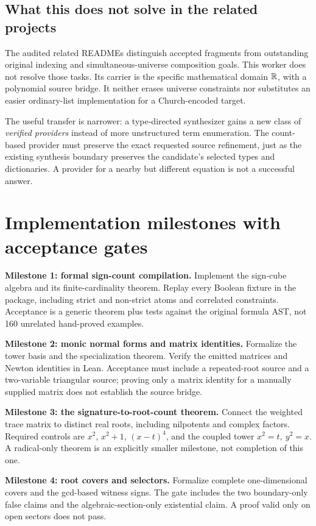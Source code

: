 \subsection{What this does not solve in the related projects}

The audited related READMEs distinguish accepted fragments from outstanding original indexing and simultaneous-universe composition goals. This worker does not resolve those tasks. Its carrier is the specific mathematical domain $\mathbb R$, with a polynomial source bridge. It neither erases universe constraints nor substitutes an easier ordinary-list implementation for a Church-encoded target.

The useful transfer is narrower: a type-directed synthesizer gains a new class of \emph{verified providers} instead of more unstructured term enumeration. The count-based provider must preserve the exact requested source refinement, just as the existing synthesis boundary preserves the candidate's selected types and dictionaries. A provider for a nearby but different equation is not a successful answer.

\section{Implementation milestones with acceptance gates}\label{sec:roadmap}

\textbf{Milestone 1: formal sign-count compilation.} Implement the sign-cube algebra and its finite-cardinality theorem. Replay every Boolean fixture in the package, including strict and non-strict atoms and correlated constraints. Acceptance is a generic theorem plus tests against the original formula AST, not 160 unrelated hand-proved examples.

\textbf{Milestone 2: monic normal forms and matrix identities.} Formalize the tower basis and the specialization theorem. Verify the emitted matrices and Newton identities in Lean. Acceptance must include a repeated-root source and a two-variable triangular source; proving only a matrix identity for a manually supplied matrix does not establish the source bridge.

\textbf{Milestone 3: the signature-to-root-count theorem.} Connect the weighted trace matrix to distinct real roots, including nilpotents and complex factors. Required controls are $x^2$, $x^2+1$, $(x-t)^4$, and the coupled tower $x^2=t,\ y^2=x$. A radical-only theorem is an explicitly smaller milestone, not completion of this one.

\textbf{Milestone 4: root covers and selectors.} Formalize complete one-dimensional covers and the gcd-based witness signs. The gate includes the two boundary-only false claims and the algebraic-section-only existential claim. A proof valid only on open sectors does not pass.

